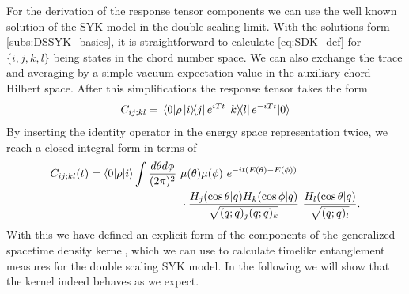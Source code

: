 \documentclass[11pt,a4paper]{article}
\begin{document}
For the derivation of the response tensor components we can use the well known solution of the SYK model in the double scaling limit. With the solutions form \cref{subs:DSSYK_basics}, it is straightforward to calculate \cref{eq:SDK_def} for $\{i,j,k,l\}$ being states in the chord number space. We can also exchange the trace and averaging by a simple vacuum expectation value in the auxiliary chord Hilbert space. After this simplifications the response tensor takes the form
\begin{align}
    C_{ij;kl} = \ev{{\rho \ketbra{i}{j} e^{iT t} \ketbra{k}{l} e^{-iTt}}}{0}
\end{align}
By inserting the identity operator in the energy space representation twice, we reach a closed integral form in terms of 
\begin{equation}
    \begin{split}
    C_{ij;kl}(t) = 
    \ev{0|\rho|i} \int \frac{d\theta d\phi}{(2\pi)^2} \ & \mu(\theta) \mu(\phi) \
    e^{-i t(E(\theta)-E(\phi))} \\
    & \cdot \frac{H_j(\cos \theta |q) H_k(\cos \phi|q)}{\sqrt{(q;q)_j (q;q)_k}} \ 
    \frac{H_l(\cos\theta |q)}{\sqrt{(q;q)_l}}.
    \end{split}
    \label{eq:kernel_integral}
\end{equation}
With this we have defined an explicit form of the components of the generalized spacetime density kernel, which we can use to calculate timelike entanglement measures for the double scaling SYK model. In the following we will show that the kernel indeed behaves as we expect.
\end{document}
